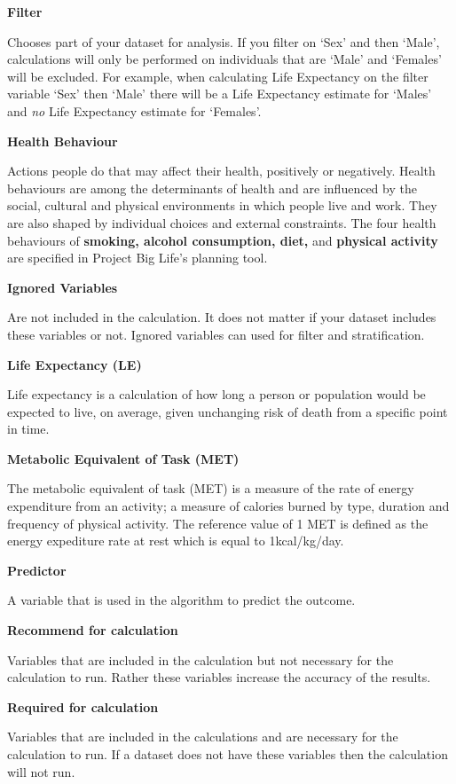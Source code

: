 \documentclass[]{book}
\begin{document}
\textbf{Filter}

Chooses part of your dataset for analysis. If you filter on
`Sex' and then `Male', calculations will only be performed on
individuals that are `Male' and `Females' will be excluded. For example,
when calculating Life Expectancy on the filter variable `Sex' then
`Male' there will be a Life Expectancy estimate for `Males' and
\emph{no} Life Expectancy estimate for `Females'.

\textbf{Health Behaviour}

Actions people do that may affect their health, positively or
negatively. Health behaviours are among the determinants of health and
are influenced by the social, cultural and physical environments in
which people live and work.\citep{StatsCan2010} They are also shaped by
individual choices and external constraints.\citep{StatsCan2010} The
four health behaviours of \textbf{smoking, alcohol consumption, diet,}
and \textbf{physical activity} are specified in Project Big Life's
planning tool.

\textbf{Ignored Variables}

Are not included in the calculation. It does not matter if your dataset
includes these variables or not. Ignored variables can used for filter
and stratification.

\textbf{Life Expectancy (LE)}

Life expectancy is a calculation of how long a person or
population would be expected to live, on average, given unchanging risk
of death from a specific point in time.

\textbf{Metabolic Equivalent of Task (MET)}

The metabolic equivalent of task (MET) is a measure of the rate of
energy expenditure from an activity; a measure of calories burned by
type, duration and frequency of physical activity. The reference value
of 1 MET is defined as the energy expediture rate at rest which is equal
to 1kcal/kg/day.

\textbf{Predictor}

A variable that is used in the algorithm to predict the outcome.

\textbf{Recommend for calculation}

Variables that are included in the calculation but not necessary for the
calculation to run. Rather these variables increase the accuracy of the
results.

\textbf{Required for calculation}

Variables that are included in the calculations and are necessary for
the calculation to run. If a dataset does not have these variables then
the calculation will not run.
\end{document}
